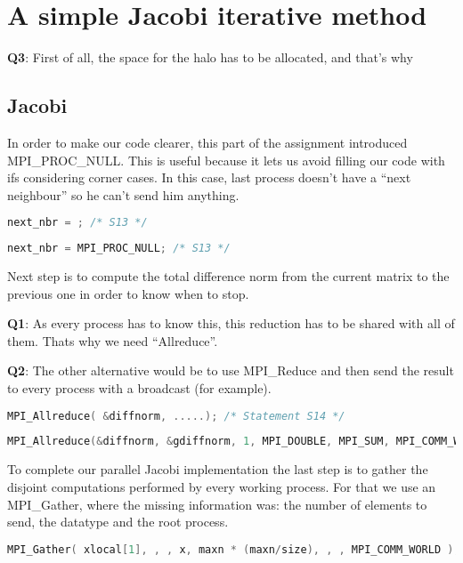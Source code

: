 \documentclass[a4paper, 10pt]{article}
\begin{document}
\section{A simple Jacobi iterative method}

\textbf{Q3}: First of all, the space for the halo has to be allocated, and that's why 


\subsection{Jacobi}
    In order to make our code clearer, this part of the assignment introduced MPI\_PROC\_NULL. This is useful because it lets us avoid filling our code with ifs considering corner cases. In this case, last process doesn't have a ``next neighbour'' so he can't send him anything. 
    \begin{lstlisting}[language=c, caption={Template S13}]
next_nbr = ; /* S13 */
    \end{lstlisting}

    \begin{lstlisting}[language=c, caption={Correct S13}]
next_nbr = MPI_PROC_NULL; /* S13 */
    \end{lstlisting}


Next step is to compute the total difference norm from the current matrix to the previous one in order to know when to stop. 

\textbf{Q1}: As every process has to know this, this reduction has to be shared with all of them. Thats why we need ``Allreduce''. 

\textbf{Q2}: The other alternative would be to use MPI\_Reduce and then send the result to every process with a broadcast (for example).
    \begin{lstlisting}[language=c, caption={Template S14}]
MPI_Allreduce( &diffnorm, .....); /* Statement S14 */
    \end{lstlisting}

    \begin{lstlisting}[language=c, caption={Correct S14}]
MPI_Allreduce(&diffnorm, &gdiffnorm, 1, MPI_DOUBLE, MPI_SUM, MPI_COMM_WORLD); /* S14 */
    \end{lstlisting}


To complete our parallel Jacobi implementation the last step is to gather the disjoint computations performed by every working process. For that we use an MPI\_Gather, where the missing information was: the number of elements to send, the datatype and the root process.
    \begin{lstlisting}[language=c, caption={Template }]
MPI_Gather( xlocal[1], , , x, maxn * (maxn/size), , , MPI_COMM_WORLD ); /* S15 */

    \end{lstlisting}
\end{document}
